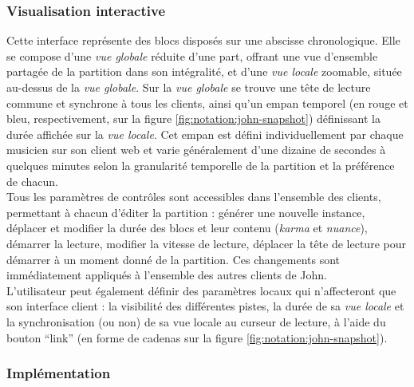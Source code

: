 \subsubsection{Visualisation interactive}

\noindent Cette interface représente des blocs disposés sur une abscisse chronologique. Elle se compose d'une \textit{vue globale} réduite d'une part, offrant une vue d'ensemble partagée de la partition dans son intégralité, et d'une \textit{vue locale} zoomable, située au-dessus de la \textit{vue globale}. Sur la \textit{vue globale} se trouve une tête de lecture commune et synchrone à tous les clients, ainsi qu'un empan temporel (en rouge et bleu, respectivement, sur la figure \ref{fig:notation:john-snapshot}) définissant la durée affichée sur la \textit{vue locale}. Cet empan est défini individuellement par chaque musicien sur son client web et varie généralement d'une dizaine de secondes à quelques minutes selon la granularité temporelle de la partition et la préférence de chacun.\\
\indent Tous les paramètres de contrôles sont accessibles dans l'ensemble des clients, permettant à chacun d'éditer la partition : générer une nouvelle instance, déplacer et modifier la durée des blocs et leur contenu (\textit{karma} et \textit{nuance}), démarrer la lecture, modifier la vitesse de lecture, déplacer la tête de lecture pour démarrer à un moment donné de la partition. Ces changements sont immédiatement appliqués à l'ensemble des autres clients de John.\\
\indent L'utilisateur peut également définir des paramètres locaux qui n'affecteront que son interface client : la visibilité des différentes pistes, la durée de sa \textit{vue locale} et la synchronisation (ou non) de sa vue locale au curseur de lecture, à l'aide du bouton ``link'' (en forme de cadenas sur la figure \ref{fig:notation:john-snapshot}).

\subsubsection{Implémentation}

